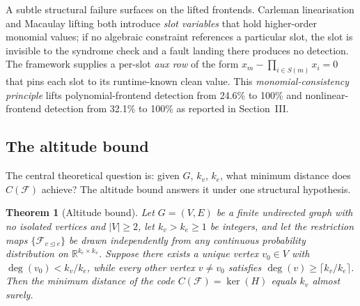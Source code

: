 \documentclass[12pt,a4paper]{article}
\theoremstyle{plain}
\newtheorem{theorem}{Theorem}
\theoremstyle{definition}
\begin{document}
A subtle structural failure surfaces on the lifted frontends. Carleman linearisation and Macaulay lifting both introduce \textit{slot variables} that hold higher-order monomial values; if no algebraic constraint references a particular slot, the slot is invisible to the syndrome check and a fault landing there produces no detection. The framework supplies a per-slot \textit{aux row} of the form $x_{m} - \prod_{i \in S(m)} x_i = 0$ that pins each slot to its runtime-known clean value. This \textit{monomial-consistency principle} lifts polynomial-frontend detection from 24.6\% to 100\% and nonlinear-frontend detection from 32.1\% to 100\% as reported in Section~III.

\subsection{The altitude bound}

The central theoretical question is: given $G$, $k_v$, $k_e$, what minimum distance does $C(\mathcal{F})$ achieve? The altitude bound answers it under one structural hypothesis.

\begin{theorem}[Altitude bound]
\label{thm:altitude}
Let $G = (V, E)$ be a finite undirected graph with no isolated vertices and $|V| \geq 2$, let $k_v > k_e \geq 1$ be integers, and let the restriction maps $\{\mathcal{F}_{v \trianglelefteq e}\}$ be drawn independently from any continuous probability distribution on $\mathbb{R}^{k_e \times k_v}$. Suppose there exists a unique vertex $v_0 \in V$ with $\deg(v_0) < k_v / k_e$, while every other vertex $v \neq v_0$ satisfies $\deg(v) \geq \lceil k_v / k_e \rceil$. Then the minimum distance of the code $C(\mathcal{F}) = \ker(H)$ equals $k_v$ almost surely.
\end{theorem}
\end{document}
